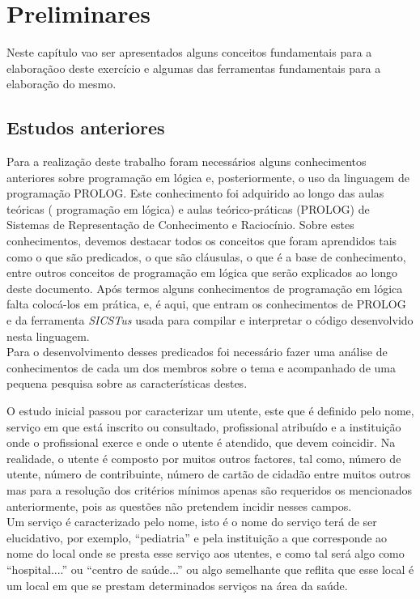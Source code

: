 \chapter{Preliminares}
\label{cap:p2}
Neste capítulo vao ser apresentados alguns conceitos fundamentais para a elaboraçãoo deste
exercício e algumas das ferramentas fundamentais para a elaboração do mesmo.


\section{Estudos anteriores}
\label{p2:estudp}
Para a realização deste trabalho foram necessários alguns conhecimentos anteriores sobre programação em lógica e, posteriormente, o uso da linguagem de programação PROLOG.
Este conhecimento foi adquirido ao longo das aulas teóricas ( programação em lógica) e aulas
teórico-práticas (PROLOG) de Sistemas de Representação de Conhecimento e Raciocínio.
Sobre estes conhecimentos, devemos destacar todos os conceitos que foram aprendidos tais
como o que são predicados, o que são cláusulas, o que é a base de conhecimento, entre outros
conceitos de programação em lógica que serão explicados ao longo deste documento.
Após termos alguns conhecimentos de programação em lógica falta colocá-los em prática,
e, é aqui, que entram os conhecimentos de PROLOG e da ferramenta \textit{SICSTus} usada para
compilar e interpretar o código desenvolvido nesta linguagem.
\\

Para o desenvolvimento desses predicados foi necessário fazer uma análise de conhecimentos de cada um dos membros sobre o tema e acompanhado de uma pequena pesquisa sobre as características destes.

O estudo inicial passou por caracterizar um utente, este que é definido pelo nome, serviço em que está inscrito ou consultado, profissional atribuído e a instituição onde o profissional exerce e onde o utente é atendido, que devem coincidir. Na realidade, o utente é composto por muitos outros factores, tal como, número de utente, número de contribuinte, número de cartão de cidadão entre muitos outros mas para a resolução dos critérios mínimos apenas são requeridos os mencionados anteriormente, pois as questões não pretendem incidir nesses campos.
\\

Um serviço é caracterizado pelo nome, isto é o nome do serviço terá de ser elucidativo, por exemplo, “pediatria” e pela instituição a que corresponde ao nome do local onde se presta esse serviço aos utentes, e como tal será algo como “hospital....” ou “centro de saúde...” ou algo semelhante que reflita que esse local é um local em que se prestam determinados serviços na área da saúde.
\\

